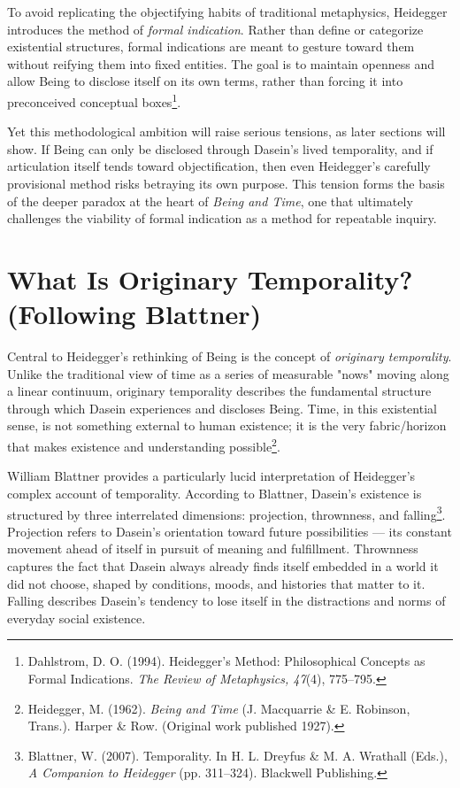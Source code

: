 \documentclass{article}
\begin{document}
To avoid replicating the objectifying habits of traditional metaphysics, Heidegger introduces the method of \textit{formal indication}. Rather than define or categorize existential structures, formal indications are meant to gesture toward them without reifying them into fixed entities. The goal is to maintain openness and allow Being to disclose itself on its own terms, rather than forcing it into preconceived conceptual boxes\footnote{Dahlstrom, D. O. (1994). Heidegger's Method: Philosophical Concepts as Formal Indications. \textit{The Review of Metaphysics, 47}(4), 775--795.}.

Yet this methodological ambition will raise serious tensions, as later sections will show. If Being can only be disclosed through Dasein's lived temporality, and if articulation itself tends toward objectification, then even Heidegger's carefully provisional method risks betraying its own purpose. This tension forms the basis of the deeper paradox at the heart of \textit{Being and Time}, one that ultimately challenges the viability of formal indication as a method for repeatable inquiry.

\section*{What Is Originary Temporality? \\ (Following Blattner)}

Central to Heidegger's rethinking of Being is the concept of \textit{originary temporality}. Unlike the traditional view of time as a series of measurable "nows" moving along a linear continuum, originary temporality describes the fundamental structure through which Dasein experiences and discloses Being. Time, in this existential sense, is not something external to human existence; it is the very fabric/horizon that makes existence and understanding possible\footnote{Heidegger, M. (1962). \textit{Being and Time} (J. Macquarrie \& E. Robinson, Trans.). Harper \& Row. (Original work published 1927).}.

William Blattner provides a particularly lucid interpretation of Heidegger's complex account of temporality. According to Blattner, Dasein's existence is structured by three interrelated dimensions: projection, thrownness, and falling\footnote{Blattner, W. (2007). Temporality. In H. L. Dreyfus \& M. A. Wrathall (Eds.), \textit{A Companion to Heidegger} (pp. 311--324). Blackwell Publishing.}. Projection refers to Dasein's orientation toward future possibilities --- its constant movement ahead of itself in pursuit of meaning and fulfillment. Thrownness captures the fact that Dasein always already finds itself embedded in a world it did not choose, shaped by conditions, moods, and histories that matter to it. Falling describes Dasein's tendency to lose itself in the distractions and norms of everyday social existence.
\end{document}
